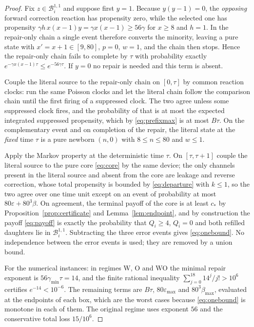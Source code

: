 \documentclass[11pt,a4paper]{article}
\theoremstyle{plain}
\theoremstyle{definition}
\theoremstyle{remark}
\newcommand{\B}{\mathcal B}
\newcommand{\eps}{\varepsilon}
\begin{document}
\begin{proof}
Fix $z\in\B_i^{1,1}$ and suppose first $y=1$. Because $y(y-1)=0$, the \emph{opposing}
forward correction reaction has propensity zero, while the selected one has propensity
$\gamma h\,x(x-1)y=\gamma x(x-1)\ge56\gamma$ for $x\ge8$ and $h=1$. In the repair-only
chain a single event therefore converts the minority, leaving a pure state with
$x'=x+1\in[9,80]$, $p=0$, $w=1$, and the chain then stops. Hence the repair-only chain
fails to complete by $\tau$ with probability exactly $e^{-\gamma x(x-1)\tau}\le
e^{-56\gamma\tau}$. If $y=0$ no repair is needed and this term is absent.

Couple the literal source to the repair-only chain on $[0,\tau]$ by common reaction
clocks: run the same Poisson clocks and let the literal chain follow the comparison chain
until the first firing of a suppressed clock. The two agree unless some suppressed clock
fires, and the probability of that is at most the expected integrated suppressed
propensity, which by \eqref{eq:prefixmax} is at most $B\tau$. On the complementary event
and on completion of the repair, the literal state at the \emph{fixed} time $\tau$ is a
pure newborn $(n,0)$ with $8\le n\le80$ and $w\le1$.

Apply the Markov property at the deterministic time $\tau$. On $[\tau,\tau+1]$ couple the
literal source to the pure core \eqref{eq:core} by the same device; the only channels
present in the literal source and absent from the core are leakage and reverse
correction, whose total propensity is bounded by \eqref{eq:departure} with $k\le1$, so
the two agree over one time unit except on an event of probability at most
$80\eps+80^3\beta$. On agreement, the terminal payoff of the core is at least $c_*$ by
Proposition~\ref{prop:certificate} and Lemma~\ref{lem:endpoint}, and by construction the
payoff \eqref{eq:payoff} is exactly the probability that $Q_i\ge4$, $Q_{\bar i}=0$ and
both refilled daughters lie in $\B_i^{1,1}$. Subtracting the three error events gives
\eqref{eq:onebound}. No independence between the error events is used; they are removed
by a union bound.

For the numerical instances: in regimes W, O and WO the minimal repair exponent is
$56\gamma_{\min}\tau=14$, and the finite rational inequality
$\sum_{j=0}^{18}14^{j}/j!>10^{6}$ certifies $e^{-14}<10^{-6}$. The remaining terms are
$B\tau$, $80\eps_{\max}$ and $80^3\beta_{\max}$, evaluated at the endpoints of each box,
which are the worst cases because \eqref{eq:onebound} is monotone in each of them. The
original regime uses exponent $56$ and the conservative total loss $15/10^{6}$.
\end{proof}
\end{document}
